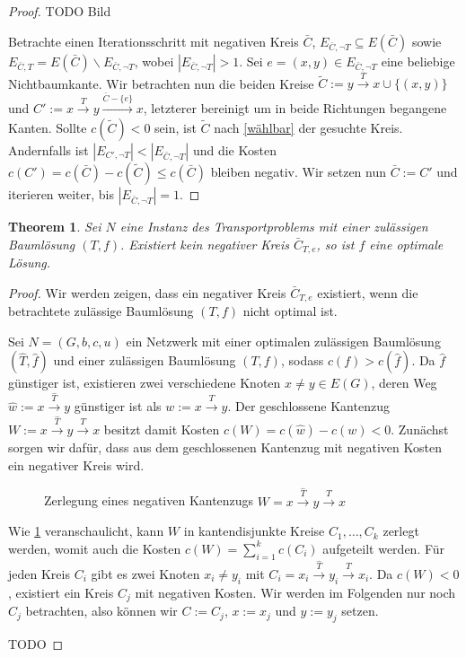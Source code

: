 \documentclass[a4paper,twoside,ngerman]{report}
\theoremstyle{plain}
\newtheorem{thm}{Theorem}
\theoremstyle{definition}
\begin{document}
\begin{proof}
TODO Bild

Betrachte einen Iterationsschritt mit negativen Kreis $\bar{C}$, $E_{\bar{C},\neg T}\subseteq E(\bar{C})$ sowie $E_{\bar{C},T}=E(\bar{C})\backslash E_{\bar{C},\neg T}$, wobei $|E_{\bar{C},\neg T}|>1$. Sei $e=(x,y)\in E_{\bar{C},\neg T}$ eine beliebige Nichtbaumkante. Wir betrachten nun die beiden Kreise $\tilde{C}:=y\xrightarrow{T}x\cup\{(x,y)\}$ und $C':=x\xrightarrow{T}y\xrightarrow{\bar{C}-\{e\}}x$, letzterer bereinigt um in beide Richtungen begangene Kanten. Sollte $c(\tilde{C})<0$ sein, ist $\tilde{C}$ nach \cref{wählbar} der gesuchte Kreis. Andernfalls ist $|E_{C',\neg T}|<|E_{\bar{C},\neg T}|$ und die Kosten $c(C')=c(\bar{C})-c(\tilde{C})\leq c(\bar{C})$ bleiben negativ. Wir setzen nun $\bar{C}:=C'$ und iterieren weiter, bis $|E_{\bar{C},\neg T}|=1$.\end{proof}

\begin{thm}\label{opt}Sei $N$ eine Instanz des Transportproblems mit einer zulässigen Baumlösung $(T,f)$. Existiert kein negativer Kreis $\bar{C}_{T,e}$, so ist $f$ eine optimale Lösung.\end{thm}
\begin{proof}Wir werden zeigen, dass ein negativer Kreis $\bar{C}_{T,e}$ existiert, wenn die betrachtete zulässige Baumlösung $(T,f)$ nicht optimal ist.
	
Sei $N=(G,b,c,u)$ ein Netzwerk mit einer optimalen zulässigen Baumlösung $(\hat{T},\hat{f})$ und einer zulässigen Baumlösung $(T,f)$, sodass $c(f)>c(\hat{f})$. Da $\hat{f}$ günstiger ist, existieren zwei verschiedene Knoten $x\neq y\in E(G)$, deren Weg $\hat{w}:=x\xrightarrow{\hat{T}}y$ günstiger ist als $w:=x\xrightarrow{T}y$. Der geschlossene Kantenzug $W:=x\xrightarrow{\hat{T}}y\xrightarrow{T}x$ besitzt damit Kosten $c(W)=c(\hat{w})-c(w)<0$. Zunächst sorgen wir dafür, dass aus dem geschlossenen Kantenzug mit negativen Kosten ein negativer Kreis wird.

\begin{figure}[!h]\centering
	
\caption{Zerlegung eines negativen Kantenzugs $W=x\xrightarrow{\hat{T}}y\xrightarrow{T}x$}
\label{fig:decomp}
\end{figure}

Wie \cref{fig:decomp} veranschaulicht, kann $W$ in kantendisjunkte Kreise $C_1,\ldots,C_k$ zerlegt werden, womit auch die Kosten $c(W)=\sum_{i=1}^{k}c(C_i)$ aufgeteilt werden. Für jeden Kreis $C_i$ gibt es zwei Knoten $x_i\neq y_i$ mit $C_i=x_i\xrightarrow{\hat{T}}y_i\xrightarrow{T}x_i$. Da $c(W)<0$, existiert ein Kreis $C_j$ mit negativen Kosten. Wir werden im Folgenden nur noch $C_j$ betrachten, also können wir $C:=C_j$, $x:=x_j$ und $y:=y_j$ setzen.

TODO
\end{proof}
\end{document}
